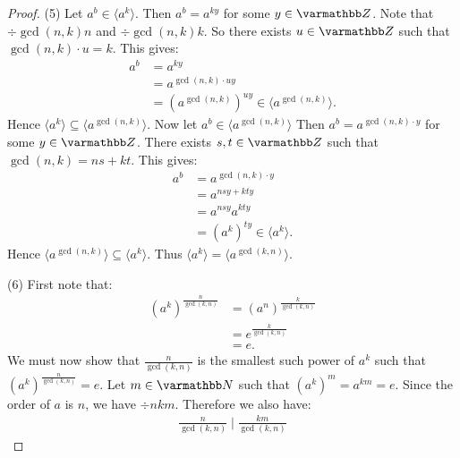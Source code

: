 \begin{proof}
            \noindent (5) Let $a^b \in \langle a^k \rangle$. Then $a^b = a^{ky}$ for some $y \in \bfZ$. Note that $\div{\gcd (n,k)}{n}$ and $\div{\gcd (n,k)}{k}$. So there exists $u \in \bfZ$ such that $\gcd(n,k)\cdot u = k$. This gives:
                \begin{equation*}
                \begin{split}
                    a^b 
                    & = a^{ky} \\
                    & = a^{\gcd(n,k)\cdot u y} \\
                    & = \left(a^{\gcd(n,k)}\right)^{uy} \in \langle a^{\gcd(n,k)} \rangle.
                \end{split}
                \end{equation*}
            Hence $\langle a^k \rangle  \subseteq \langle a^{\gcd(n,k)} \rangle$. Now let $a^b \in \langle a^{\gcd(n,k)} \rangle$ Then $a^b = a^{\gcd(n,k) \cdot y}$ for some $y \in \bfZ$. There exists $s,t \in \bfZ$ such that $\gcd(n,k) = ns + kt$. This gives: 
                \begin{equation*}
                \begin{split}
                    a^b 
                    & = a^{\gcd(n,k)\cdot y} \\
                    & = a^{nsy + kty} \\
                    & = a^{nsy} a^{kty} \\
                    & = \left(a^k\right)^{ty} \in \langle a^k \rangle.
                \end{split}
                \end{equation*}
            Hence $\langle a^{\gcd(n,k)} \rangle \subseteq \langle a^k \rangle$. Thus $\langle a^k \rangle = \langle a^{\gcd(k,n)} \rangle$. \nl
            
            \noindent (6) First note that:
                \begin{equation*}
                \begin{split}
                    \left( a^k \right)^{\frac{n}{\gcd(k,n)}} 
                    & = \left(a^n\right)^\frac{k}{\gcd(k,n)} \\
                    & = e^\frac{k}{\gcd(k,n)} \\
                    & = e.
                \end{split}
                \end{equation*}
            We must now show that $\frac{n}{\gcd(k,n)}$ is the smallest such power of $a^k$ such that $\left( a^k \right)^{\frac{n}{\gcd(k,n)}} = e$. Let $m \in \bfN$ such that $(a^k)^m = a^{km} = e$. Since the order of $a$ is $n$, we have $\div{n}{km}$. Therefore we also have:
                \begin{equation*}
                \begin{split}
                    \frac{n}{\gcd(k,n)} \mid \frac{km}{\gcd{(k,n)}}
                \end{split}
                \end{equation*}
            
            
            
        \end{proof}

